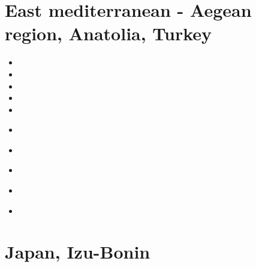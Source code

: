 \section{East mediterranean - Aegean region, Anatolia, Turkey} 

\begin{small}
\begin{itemize}
\item[\nineteenseventyeight] 
\item[\nineteenninetynine] 
\item[\twothousandthree] 
\item[\twothousandten] 
\item[\twothousandeleven] 
\item[\twothousandthirteen] 
\\ 
\item[\twothousandseventeen] 
\item[\twothousandtwenty] 
 \\
\item[\twothousandtwentyone] 
 \\
\item[\twothousandtwentythree]
\end{itemize}
\end{small}

\section{Japan, Izu-Bonin} 


